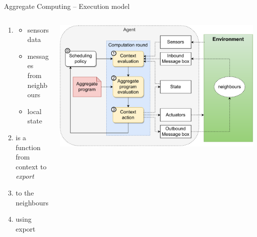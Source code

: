 \documentclass[8pt, aspectratio=169, handout]{beamer}
\begin{document}
\begin{frame}{Aggregate Computing -- Execution model}
  \begin{columns}
    \begin{column}{0.49\textwidth}
      \begin{card}
        \begin{enumerate}
          \item {}
          \begin{itemize}
            \item sensors data
            \item messages from neighbours
            \item local state
          \end{itemize}
          \item {} is a function from context to \emph{export}
          \item {} to the neighbours
          \item {} using export
        \end{enumerate}
      \end{card}
    \end{column}
    \begin{column}{0.51\textwidth}  
      \begin{cardTiny}
        \includegraphics[width=\textwidth]{img/aggregate-agent-control-architecture.drawio.pdf}    
      \end{cardTiny}
    \end{column}
  \end{columns}
\end{frame}
\end{document}
